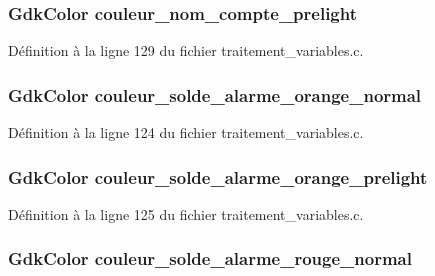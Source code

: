 \subsubsection[{couleur\_\-nom\_\-compte\_\-prelight}]{\setlength{\rightskip}{0pt plus 5cm}GdkColor {\bf couleur\_\-nom\_\-compte\_\-prelight}}\label{accueil_8c_a52532ca2dfcfc96be10da30f80c66839}


Définition à la ligne 129 du fichier traitement\_\-variables.c.

\subsubsection[{couleur\_\-solde\_\-alarme\_\-orange\_\-normal}]{\setlength{\rightskip}{0pt plus 5cm}GdkColor {\bf couleur\_\-solde\_\-alarme\_\-orange\_\-normal}}\label{accueil_8c_a062471eba775cb09f75d8c4d97c02172}


Définition à la ligne 124 du fichier traitement\_\-variables.c.

\subsubsection[{couleur\_\-solde\_\-alarme\_\-orange\_\-prelight}]{\setlength{\rightskip}{0pt plus 5cm}GdkColor {\bf couleur\_\-solde\_\-alarme\_\-orange\_\-prelight}}\label{accueil_8c_a0619465546390ec6f870c9f85b773307}


Définition à la ligne 125 du fichier traitement\_\-variables.c.

\subsubsection[{couleur\_\-solde\_\-alarme\_\-rouge\_\-normal}]{\setlength{\rightskip}{0pt plus 5cm}GdkColor {\bf couleur\_\-solde\_\-alarme\_\-rouge\_\-normal}}\label{accueil_8c_af38b374eef29a79c10501f0560f0569e}


